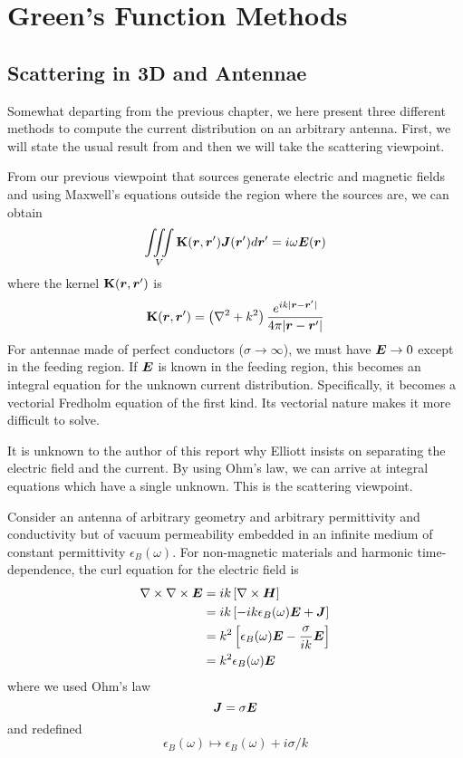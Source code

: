 \section{Green's Function Methods}\label{sec:app.basisEqn.greenFunction}

\subsection{Scattering in 3D and Antennae}
Somewhat departing from the previous chapter, we here present
three different methods to compute the current distribution on 
an arbitrary antenna. First, we will state the usual result 
from \cite{ELL2003} and then we will take the scattering viewpoint.

From our previous
viewpoint that sources generate electric and magnetic fields 
and using Maxwell's equations outside the region where the sources 
are, we can obtain \cite{ELL2003}
  \begin{equation}
    \mathop{\iiint}_V \mathbf{K}(\boldsymbol{r},\boldsymbol{r}')\boldsymbol{J}(\boldsymbol{r}')d\boldsymbol{r}' = i\omega\boldsymbol{E}(\boldsymbol{r})
  \end{equation}
where the kernel $\mathbf{K}(\boldsymbol{r},\boldsymbol{r}')$ is 
  \begin{equation}
    \mathbf{K}(\boldsymbol{r},\boldsymbol{r}') = \left(\nabla^2+k^2\right)\frac{e^{ik|\boldsymbol{r}-\boldsymbol{r}'|}}{4\pi|\boldsymbol{r}-\boldsymbol{r}'|}
  \end{equation}
For antennae made of perfect conductors ($\sigma\rightarrow\infty$), we must have $\boldsymbol{E}\rightarrow0$
except in the feeding region. If $\boldsymbol{E}$ is known in the feeding region, this becomes an integral equation
for the unknown current distribution. Specifically, it becomes a vectorial Fredholm equation of the first kind. 
Its vectorial nature makes it more difficult to solve. 

It is unknown to the author of this report why Elliott insists on separating the electric field and the current. 
By using Ohm's law, we can arrive at integral equations which have a single unknown. This is the 
scattering viewpoint. 
  
Consider an antenna of arbitrary geometry and arbitrary
permittivity and conductivity but of  vacuum permeability embedded in an infinite
medium of constant permittivity $\epsilon_B(\omega)$. For non-magnetic materials
and harmonic time-dependence, 
the curl equation for the electric field is 
  \begin{align*}
   \nabla\times\nabla\times\boldsymbol{E}	&=ik\left[\nabla\times\boldsymbol{H}\right]	\\
					&=ik\left[-ik\epsilon_B(\omega)\boldsymbol{E}+\boldsymbol{J}\right]	\\
					&=k^2\left[\epsilon_B(\omega)\boldsymbol{E}-\frac{\sigma}{ik}\boldsymbol{E}\right]	\\
					&=k^2\epsilon_B(\omega)\boldsymbol{E}
  \end{align*}
where we used Ohm's law
  \begin{equation}
   \boldsymbol{J}=\sigma\boldsymbol{E}
  \end{equation}
and redefined 
  \begin{equation}
   \epsilon_B(\omega)\mapsto\epsilon_B(\omega)+i\sigma/k
  \end{equation}

